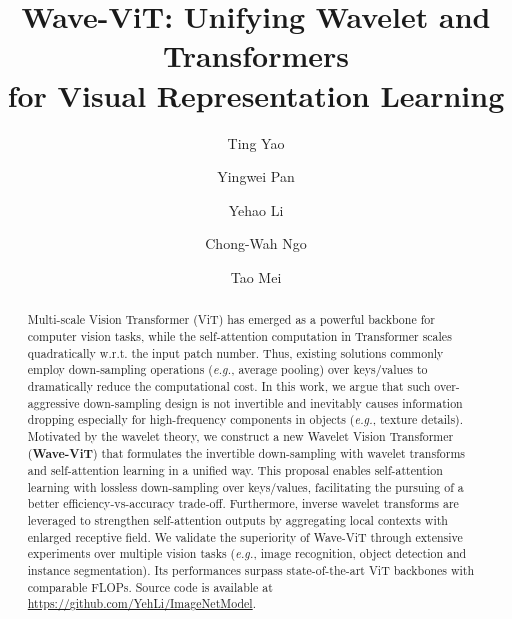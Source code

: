 \documentclass[runningheads]{llncs}
\begin{document}
\pagestyle{headings}
\mainmatter
\def\ECCVSubNumber{6127}  

\title{Wave-ViT: Unifying Wavelet and Transformers \\for Visual Representation Learning} 



\author{Ting Yao \and
Yingwei Pan \and
Yehao Li \and
Chong-Wah Ngo \and
Tao Mei}
\maketitle

\begin{abstract}
Multi-scale Vision Transformer (ViT) has emerged as a powerful backbone for computer vision tasks, while the self-attention computation in Transformer scales quadratically w.r.t. the input patch number. Thus, existing solutions commonly employ down-sampling operations (\emph{e.g.}, average pooling) over keys/values to dramatically reduce the computational cost. In this work, we argue that such over-aggressive down-sampling design is not invertible and inevitably causes information dropping especially for high-frequency components in objects (\emph{e.g.}, texture details). Motivated by the wavelet theory, we construct a new Wavelet Vision Transformer (\textbf{Wave-ViT}) that formulates the invertible down-sampling with wavelet transforms and self-attention learning in a unified way. This proposal enables self-attention learning with lossless down-sampling over keys/values, facilitating the pursuing of a better efficiency-vs-accuracy trade-off. Furthermore, inverse wavelet transforms are leveraged to strengthen self-attention outputs by aggregating local contexts with enlarged receptive field. We validate the superiority of Wave-ViT through extensive experiments over multiple vision tasks (\emph{e.g.}, image recognition, object detection and instance segmentation). Its performances surpass state-of-the-art ViT backbones with comparable FLOPs. Source code is available at \url{https://github.com/YehLi/ImageNetModel}.


\end{abstract}
\end{document}

